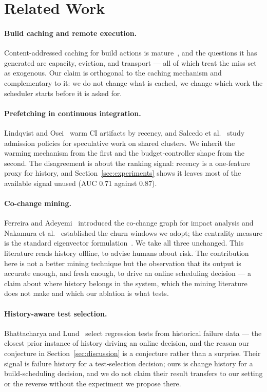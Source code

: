 \documentclass{anvil-paper}
\begin{document}
\section{Related Work}
\label{sec:related}

\paragraph{Build caching and remote execution.}
Content-addressed caching for build actions is mature~\cite{okonkwo2019remote},
and the questions it has generated are capacity, eviction, and transport --- all
of which treat the miss set as exogenous. Our claim is orthogonal to the
caching mechanism and complementary to it: we do not change what is cached, we
change which work the scheduler starts before it is asked for.

\paragraph{Prefetching in continuous integration.}
Lindqvist and Osei~\cite{lindqvist2021prefetch} warm CI artifacts by recency,
and Salcedo et al.~\cite{salcedo2023speculative} study admission policies for
speculative work on shared clusters. We inherit the warming mechanism from the
first and the budget-controller shape from the second. The disagreement is
about the ranking signal: recency is a one-feature proxy for history, and
Section~\ref{sec:experiments} shows it leaves most of the available signal
unused (AUC 0.71 against 0.87).

\paragraph{Co-change mining.}
Ferreira and Adeyemi~\cite{ferreira2016cochange} introduced the co-change graph
for impact analysis and Nakamura et al.~\cite{nakamura2020churn} established
the churn windows we adopt; the centrality measure is the standard eigenvector
formulation~\cite{imani2017graphcentrality}. We take all three unchanged. This
literature reads history offline, to advise humans about risk. The
contribution here is not a better mining technique but the observation that
its output is accurate enough, and fresh enough, to drive an online scheduling
decision --- a claim about where history belongs in the system, which the
mining literature does not make and which our ablation is what tests.

\paragraph{History-aware test selection.}
Bhattacharya and Lund~\cite{bhattacharya2022testsel} select regression tests
from historical failure data --- the closest prior instance of history driving an
online decision, and the reason our conjecture in Section~\ref{sec:discussion}
is a conjecture rather than a surprise. Their signal is failure history for a
test-selection decision; ours is change history for a build-scheduling
decision, and we do not claim their result transfers to our setting or the
reverse without the experiment we propose there.
\end{document}
